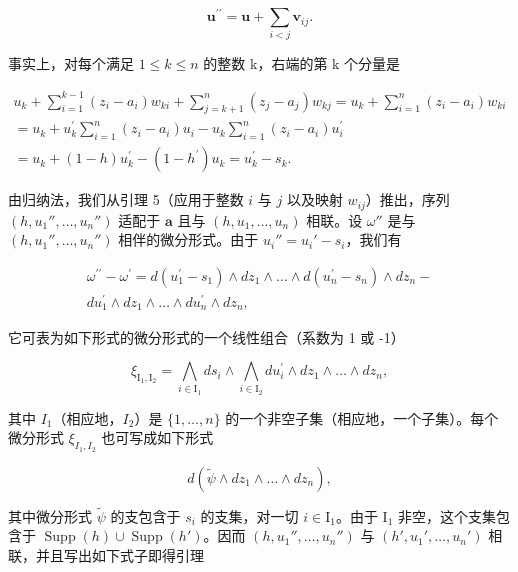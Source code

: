 \[
\boldsymbol {u} ^ {\prime \prime} = \boldsymbol {u} + \sum_ {i <   j} \boldsymbol {v} _ {i j}.
\]

事实上，对每个满足 \(1 \leqslant k \leqslant n\) 的整数 k，右端的第 k 个分量是

\[
\begin{array}{c} u _ {k} + \sum_ {i = 1} ^ {k - 1} (z _ {i} - a _ {i}) w _ {k i} + \sum_ {j = k + 1} ^ {n} (z _ {j} - a _ {j}) w _ {k j} = u _ {k} + \sum_ {i = 1} ^ {n} (z _ {i} - a _ {i}) w _ {k i} \\ = u _ {k} + u _ {k} ^ {\prime} \sum_ {i = 1} ^ {n} (z _ {i} - a _ {i}) u _ {i} - u _ {k} \sum_ {i = 1} ^ {n} (z _ {i} - a _ {i}) u _ {i} ^ {\prime} \\ = u _ {k} + (1 - h) u _ {k} ^ {\prime} - (1 - h ^ {\prime}) u _ {k} = u _ {k} ^ {\prime} - s _ {k}. \end{array}
\]

由归纳法，我们从引理 5（应用于整数 \(i\) 与 \(j\) 以及映射 \(w_{ij}\)）推出，序列 \((h,u_1'',\ldots,u_n'')\) 适配于 \(\boldsymbol{a}\) 且与 \((h,u_1,\ldots,u_n)\) 相联。设 \(\omega''\) 是与 \((h,u_1'',\ldots,u_n'')\) 相伴的微分形式。由于 \(u_i'' = u_i' - s_i\)，我们有

\[
\begin{array}{r} \omega^ {\prime \prime} - \omega^ {\prime} = d (u _ {1} ^ {\prime} - s _ {1}) \wedge d z _ {1} \wedge \dots \wedge d (u _ {n} ^ {\prime} - s _ {n}) \wedge d z _ {n} - \\ d u _ {1} ^ {\prime} \wedge d z _ {1} \wedge \dots \wedge d u _ {n} ^ {\prime} \wedge d z _ {n}, \end{array}
\]

它可表为如下形式的微分形式的一个线性组合（系数为 1 或 -1）

\[
\xi_ {\mathrm{I} _ {1}, \mathrm{I} _ {2}} = \bigwedge_ {i \in \mathrm{I} _ {1}} d s _ {i} \wedge \bigwedge_ {i \in \mathrm{I} _ {2}} d u _ {i} ^ {\prime} \wedge d z _ {1} \wedge \dots \wedge d z _ {n},
\]

其中 \(I_{1}\)（相应地，\(I_{2}\)）是 \(\{1,\ldots,n\}\) 的一个非空子集（相应地，一个子集）。每个微分形式 \(\xi_{I_{1},I_{2}}\) 也可写成如下形式

\[
d (\widetilde {\psi} \wedge d z _ {1} \wedge \dots \wedge d z _ {n}),
\]

其中微分形式 \(\widetilde{\psi}\) 的支包含于 \(s_i\) 的支集，对一切 \(i \in \mathrm{I}_1\)。由于 \(\mathrm{I}_1\) 非空，这个支集包含于 \(\operatorname{Supp}(h) \cup \operatorname{Supp}(h')\)。因而 \((h, u_1'', \ldots, u_n'')\) 与 \((h', u_1', \ldots, u_n')\) 相联，并且写出如下式子即得引理


